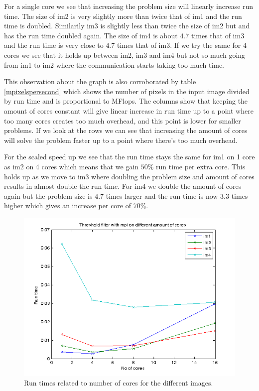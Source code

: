 \documentclass[a4paper,11pt]{article}
\begin{document}
For a single core we see that increasing the problem size will linearly increase run time. The size of im2 is very slightly more than twice that of im1 and the run time is doubled. Similarily im3 is slightly less than twice the size of im2 but and has the run time doubled again. The size of im4 is about $4.7$ times that of im3 and the run time is very close to $4.7$ times that of im3. If we try the same for 4 cores we see that it holds up between im2, im3 and im4 but not so much going from im1 to im2 where the communication starts taking too much time.

This observation about the graph is also corroborated by table \ref{mpixelspersecond} which shows the number of pixels in the input image divided by run time and is proportional to MFlops. The columns show that keeping the amount of cores constant will give linear increase in run time up to a point where too many cores creates too much overhead, and this point is lower for smaller problems. If we look at the rows we can see that increasing the amount of cores will solve the problem faster up to a point where there's too much overhead.

For the scaled speed up we see that the run time stays the same for im1 on 1 core as im2 on 4 cores which means that we gain $50\%$ run time per extra core. This holds up as we move to im3 where doubling the problem size and amount of cores results in almost double the run time. For im4 we double the amount of cores again but the problem size is $4.7$ times larger and the run time is now $3.3$ times higher which gives an increase per core of $70\%$.

\begin{figure}[!h]
  \caption{Run times related to number of cores for the different images.}
  \label{runtime_vs_cores}
  \includegraphics[scale=0.9]{../plots/runtimevscoresthres.png}
\end{figure}
\end{document}
